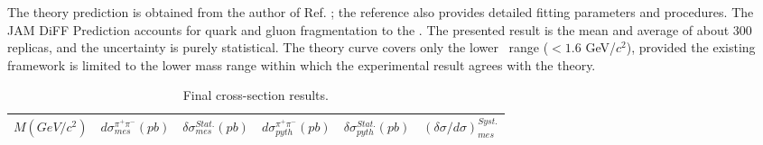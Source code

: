 The theory prediction is obtained from the author of Ref. \cite{Cocuzza:2023oam}; the reference also provides detailed fitting parameters and procedures. The JAM DiFF Prediction accounts for quark and gluon fragmentation to the \dipion. The presented result is the mean and average of about 300 replicas, and the uncertainty is purely statistical. The theory curve covers only the lower \minv\ range ($< 1.6$ GeV/$c^2$), provided the existing framework is limited to the lower mass range within which the experimental result agrees with the theory. 
 

\begin{table}
\centering
\begin{tabular}{cccccc}
\hline
$M (GeV/c^2)$ & $d\sigma^{\pi^+\pi^-}_{mes} (pb)$&$\delta\sigma^{Stat.}_{mes} (pb)$&$d\sigma^{\pi^+\pi^-}_{pyth} (pb)$&$\delta\sigma_{pyth}^{Stat.} (pb)$&$(\delta\sigma/d\sigma)^{Syst.}_{mes}$\\
\hline

\end{tabular}
\caption{Final cross-section results.}
\end{table}


